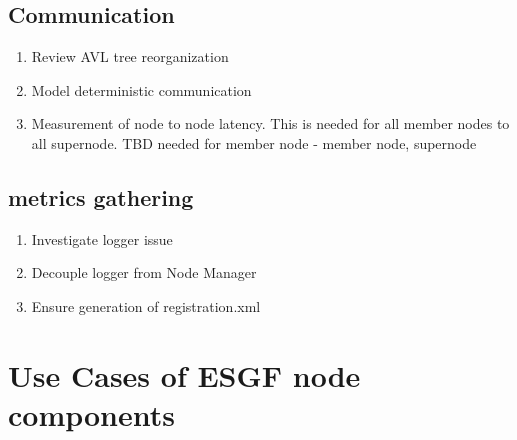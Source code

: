 \documentclass[oneside,12pt]{memoir}
\begin{document}
\subsection{Communication}

\begin{enumerate}
\item
Review AVL tree reorganization
\item
Model deterministic communication
\item
Measurement of node to node latency.  This is needed for all member nodes to all supernode.  TBD  needed for member node - member node, supernode 

\end{enumerate}



\subsection{metrics gathering}
\begin{enumerate}
\item Investigate logger issue
\item Decouple logger from Node Manager
\item Ensure generation of registration.xml
\end{enumerate}


\section{Use Cases of ESGF node components}
\end{document}
